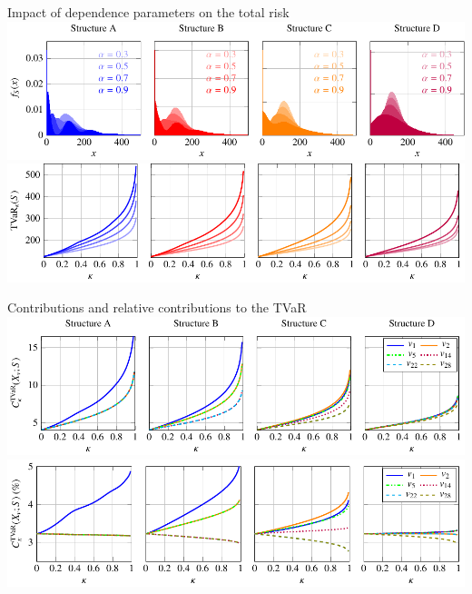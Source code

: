 \documentclass[11pt,xcolor={dvipsnames},hyperref={pdftex,pdfpagemode=UseNone,hidelinks,pdfdisplaydoctitle=true},usepdftitle=false]{beamer}
\begin{document}
\begin{frame}{Impact of dependence parameters on the total risk}
\includegraphics[width=\textwidth]{Figures/pmf_s_alpha.pdf}
\includegraphics[width=\textwidth]{Figures/tvar_s_alpha.pdf}
\end{frame}
\begin{frame}{Contributions and relative contributions to the TVaR}
\includegraphics[width=\textwidth]{Figures/contributions.pdf}
\includegraphics[width=\textwidth]{Figures/relative_contributions.pdf}
\end{frame}
\end{document}
